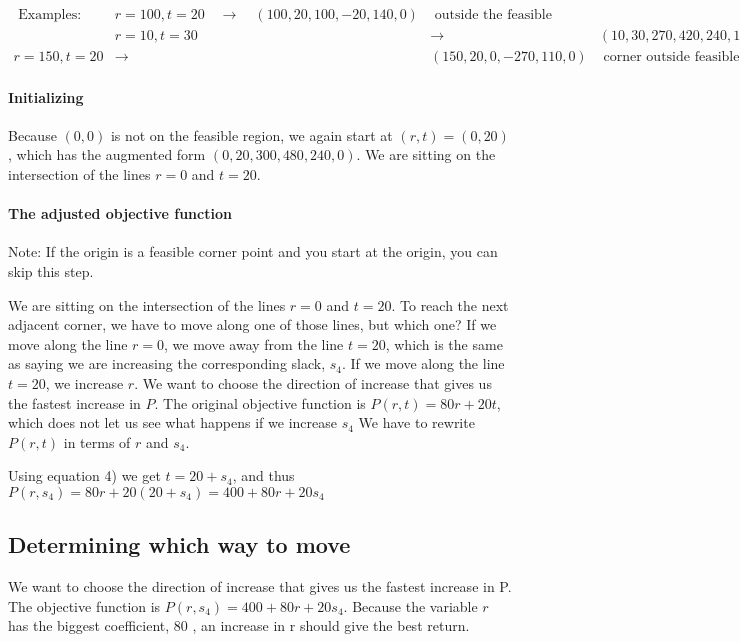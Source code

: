 $\begin{array}{lllll}\text { Examples: } & r=100, t=20 \quad \rightarrow \quad(100,20,100,-20,140,0) & \text { outside the feasible region } \\ & r=10, t=30 \quad & \rightarrow & (10,30,270,420,240,10) & \text { inside feasible region } \\ r=150, t=20 & \rightarrow & (150,20,0,-270,110,0) & \text { corner outside feasible region }\end{array}$

\paragraph{Initializing}
Because $(0,0)$ is not on the feasible region, we again start at $(r, t)=(0,20)$, which has the augmented form $(0,20,300,480,240,0)$. We are sitting on the intersection of the lines $r=0$ and $t=20$.

\paragraph{The adjusted objective function}
Note: If the origin is a feasible corner point and you start at the origin, you can skip this step.

We are sitting on the intersection of the lines $r=0$ and $t=20$. To reach the next adjacent corner, we have to move along one of those lines, but which one? If we move along the line $r=0$, we move away from the line $t=20$, which is the same as saying we are increasing the corresponding slack, $s_{4}$. If we move along the line $t=20$, we increase $r$. We want to choose the direction of increase that gives us the fastest increase in $P$. The original objective function is $P(r, t)=80 r+20 t$, which does not let us see what happens if we increase $s_{4}$ We have to rewrite $P(r, t)$ in terms of $r$ and $s_{4}$.

Using equation 4) we get $t=20+s_{4}$, and thus $P\left(r, s_{4}\right)=80 r+20\left(20+s_{4}\right)=400+80 r+20 s_{4}$

\subsection*{Determining which way to move}
We want to choose the direction of increase that gives us the fastest increase in P. The objective function is $P\left(r, s_{4}\right)=400+80 r+20 s_{4}$. Because the variable $r$ has the biggest coefficient, 80 , an increase in r should give the best return.

